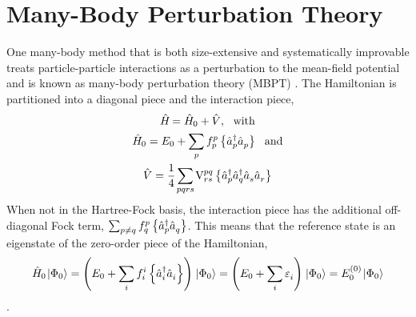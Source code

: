\documentclass[thesis.tex]{subfiles}
\begin{document}
\section{Many-Body Perturbation Theory} \label{section:MBPT}
One many-body method that is both size-extensive and systematically improvable treats particle-particle interactions as a perturbation to the mean-field potential and is known as many-body perturbation theory (MBPT) \cite{MOLLER1934,HUBBARD1957539,HUGENHOLTZ1957481,SHAVITT2009}.  The Hamiltonian is partitioned into a diagonal piece and the interaction piece,
\begin{gather} \label{eq:mbpt_hamiltonian}
  \Ham = \Ham_{0} + \hat{V},\ \ \text{with} \notag \\
  \Ham_{0} = E_{0} + \sum_{\mathclap{p}}\fint{p}{p}\normord{\co{p}\ao{p}}\ \ \text{and} \notag \\
  \hat{V} = \frac{1}{4}\sum_{\mathclap{pqrs}}\vint{pq}{rs}\normord{\co{p}\co{q}\ao{s}\ao{r}}
\end{gather}
When not in the Hartree-Fock basis, the interaction piece has the additional off-diagonal Fock term, $\sum_{p\neq q}f^{p}_{q}\left\{\hat{a}_{p}^{\dagger}\hat{a}_{q}^{}\right\}$.  This means that the reference state is an eigenstate of the zero-order piece of the Hamiltonian,
\begin{equation}
  \Ham_{0}\refket = \left(E_{0} + \sum_{\mathclap{i}}\fint{i}{i}\normord{\co{i}\ao{i}}\right)\refket = \left(E_{0} + \sum_{\mathclap{i}}\Edenom{}{i}\right)\refket = E^{(0)}_{0}\refket
\end{equation}.
\end{document}
